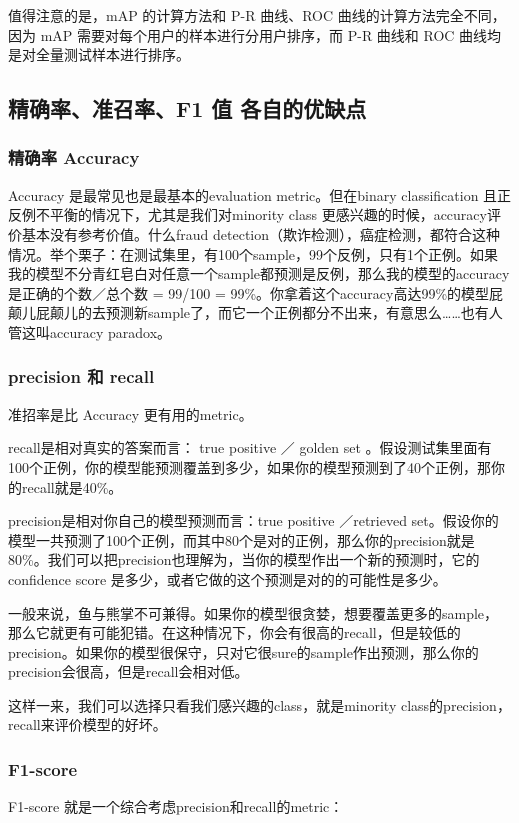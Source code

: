 \documentclass[12pt]{article}
\begin{document}
值得注意的是，mAP 的计算方法和 P-R 曲线、ROC 曲线的计算方法完全不同，因为 mAP 需要对每个用户的样本进行分用户排序，而 P-R 曲线和 ROC 曲线均是对全量测试样本进行排序。

\subsection{精确率、准召率、F1 值 各自的优缺点\cite{Compare_P_R_F1_ROC_AUC}}

\subsubsection{精确率 Accuracy}
Accuracy 是最常见也是最基本的evaluation metric。但在binary classification 且正反例不平衡的情况下，尤其是我们对minority class 更感兴趣的时候，accuracy评价基本没有参考价值。什么fraud detection（欺诈检测），癌症检测，都符合这种情况。举个栗子：在测试集里，有100个sample，99个反例，只有1个正例。如果我的模型不分青红皂白对任意一个sample都预测是反例，那么我的模型的accuracy是正确的个数／总个数 = 99/100 = 99\%。你拿着这个accuracy高达99\%的模型屁颠儿屁颠儿的去预测新sample了，而它一个正例都分不出来，有意思么……也有人管这叫accuracy paradox。

\subsubsection{precision 和 recall}
准招率是比 Accuracy 更有用的metric。

recall是相对真实的答案而言： true positive ／ golden set 。假设测试集里面有100个正例，你的模型能预测覆盖到多少，如果你的模型预测到了40个正例，那你的recall就是40\%。

precision是相对你自己的模型预测而言：true positive ／retrieved set。假设你的模型一共预测了100个正例，而其中80个是对的正例，那么你的precision就是80\%。我们可以把precision也理解为，当你的模型作出一个新的预测时，它的confidence score 是多少，或者它做的这个预测是对的的可能性是多少。

一般来说，鱼与熊掌不可兼得。如果你的模型很贪婪，想要覆盖更多的sample，那么它就更有可能犯错。在这种情况下，你会有很高的recall，但是较低的precision。如果你的模型很保守，只对它很sure的sample作出预测，那么你的precision会很高，但是recall会相对低。

这样一来，我们可以选择只看我们感兴趣的class，就是minority class的precision，recall来评价模型的好坏。

\subsubsection{F1-score}
F1-score 就是一个综合考虑precision和recall的metric： 
\end{document}

